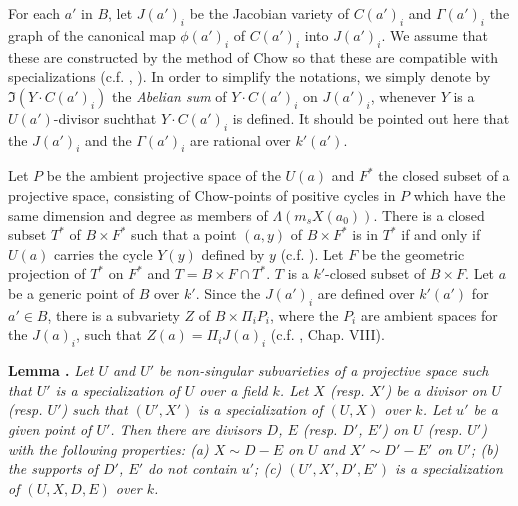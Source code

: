 For each $a'$ in $B$, let $J(a')_{i}$ be the Jacobian variety of $C(a')_{i}$ and $\Gamma(a')_{i}$ the graph of the canonical map $\phi(a')_{i}$ of $C(a')_{i}$ into $J(a')_{i}$. We assume that these are constructed by the method of Chow so that these are compatible with specializations (c.f. \cite{art14-key1}, \cite{art14-key8}). In order to simplify the notations, we simply denote by $\mathfrak{I}(Y\cdot C(a')_{i})$ the {\em Abelian sum} of $Y\cdot C(a')_{i}$ on $J(a')_{i}$, whenever $Y$ is a $U(a')$-divisor such\pageoriginale that $Y\cdot C(a')_{i}$ is defined. It should be pointed out here that the $J(a')_{i}$ and the $\Gamma(a')_{i}$ are rational over $k'(a')$.

Let $P$ be the ambient projective space of the $U(a)$ and $F^{*}$ the closed subset of a projective space, consisting of Chow-points of positive cycles in $P$ which have the same dimension and degree as members of $\Lambda(m_{s}X(a_{0}))$. There is a closed subset $T^{*}$ of $B\times F^{*}$ such that a point $(a,y)$ of $B\times F^{*}$ is in $T^{*}$ if and only if $U(a)$ carries the cycle $Y(y)$ defined by $y$ (c.f. \cite{art14-key3}). Let $F$ be the geometric projection of $T^{*}$ on $F^{*}$ and $T=B\times F\cap T^{*}$. $T$ is a $k'$-closed subset of $B\times F$. Let $a$ be a generic point of $B$ over $k'$. Since the $J(a')_{i}$ are defined over $k'(a')$ for $a'\in B$, there is a subvariety $Z$ of $B\times \Pi_{i}P_{i}$, where the $P_{i}$ are ambient spaces for the $J(a)_{i}$, such that $Z(a)=\Pi_{i}J(a)_{i}$ (c.f. \cite{art14-key25}, Chap. VIII).

\medskip
\noindent
{\bf Lemma .\label{art14-app-lem1.3}}
{\em Let $U$ and $U'$ be non-singular subvarieties of a projective space such that $U'$ is a specialization of $U$ over a field $k$. Let $X$ (resp. $X'$) be a divisor on $U$ (resp. $U'$) such that $(U',X')$ is a specialization of $(U,X)$ over $k$. Let $u'$ be a given point of $U'$. Then there are divisors $D$, $E$ (resp. $D'$, $E'$) on $U$ (resp. $U'$) with the following properties: {\rm(a)} $X\sim D-E$ on $U$ and $X'\sim D'-E'$ on $U'$; {\rm(b)} the supports of $D'$, $E'$ do not contain $u'$; {\rm(c)} $(U',X',D',E')$ is a specialization of $(U,X,D,E)$ over $k$.}

